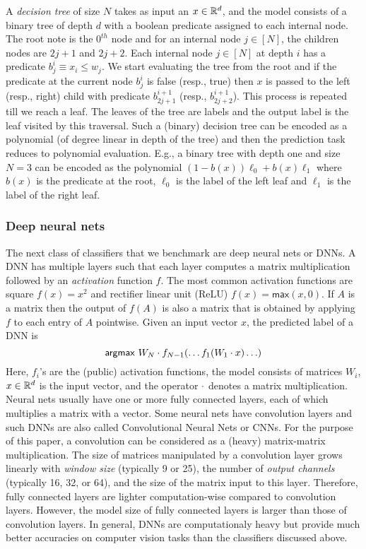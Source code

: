 A {\em decision tree} of size $N$ takes as input an $x\in{\mathbb{R}}^d$, and the
model consists of a binary tree of depth $d$ with a boolean predicate
assigned to each internal node. The root note is the $0^{th}$ node and
for an internal node $j \in [N]$, the children nodes are $2j+1$ and
$2j+2$. Each internal node $j\in[N]$ at depth $i$ has a predicate
$b_{j}^i\equiv x_i\leq w_{j}$. We start evaluating the tree from the
root and if the predicate at the current node $b_j^i$ is false (resp.,
true) then $x$ is passed to the left (resp., right) child with
predicate $b_{2j+1}^{i+1}$ (resp., $b_{2j+2}^{i+1}$). This process is
repeated till we reach a leaf. The leaves of the tree are labels and
the output label is the leaf visited by this traversal.
Such a (binary) decision tree can be encoded as a polynomial (of
degree linear in depth of the tree) and then the prediction task
reduces to polynomial evaluation. E.g., a binary tree with depth one
and size $N=3$ can be encoded as the polynomial
$(1-b(x))\ell_0 + b(x)\ell_1$ where $b(x)$ is the predicate at the
root, $\ell_0$ is the label of the left leaf and $\ell_1$ is the label
of the right leaf.

\subsubsection*{Deep neural nets}
The next class of classifiers that we benchmark are deep neural nets
or DNNs. A DNN has multiple layers such that each layer computes a
matrix
multiplication followed by an {\it activation} function $f$. The most
common activation functions are square $f(x)=x^2$ and rectifier linear
unit (ReLU) $f(x)=\mathsf{max}(x,0)$.
If $A$ is a matrix then the output of $f(A)$ is also a matrix that is
obtained by applying $f$ to each entry of $A$ pointwise.
Given an input vector $x$, the predicted label of a DNN is
\[
 \mathsf{argmax}\ W_N\cdot f_{N-1}(\ldots f_1(W_1\cdot x)\ldots)
\]
Here, $f_i$'s are the (public) activation functions, the model
consists of matrices $W_i$,  $x \in {\mathbb{R}}^d$ is the input vector, and the
operator $\cdot$ denotes a matrix multiplication.
Neural nets usually have one or more fully connected layers, each of
which multiplies a matrix with a vector.
Some neural nets have convolution layers and such DNNs are also called
Convolutional Neural Nets or CNNs.
For the purpose of this paper, a convolution can be considered as a
(heavy) matrix-matrix multiplication. The size of matrices manipulated
by a convolution layer grows linearly with {\it window size}
(typically 9 or 25), the number of {\it output channels} (typically
16, 32, or 64), and the size of the matrix input to this layer.
Therefore, fully connected layers are lighter computation-wise compared
to convolution layers. However, the model size of fully connected
layers is larger than those of convolution layers.
In general, DNNs are computationaly heavy but provide
much better accuracies on computer vision tasks than the classifiers
discussed above.

